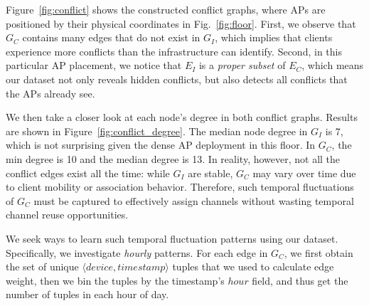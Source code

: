 Figure~\ref{fig:conflict} shows the constructed conflict graphs, where APs are positioned 
by their physical coordinates in Fig.~\ref{fig:floor}. First, we
observe that $G_C$ contains many edges that do not exist in $G_I$, which
implies that clients experience more conflicts than the infrastructure can
identify. Second, in this particular AP placement, we notice that $E_I$ is a
\textit{proper subset} of $E_C$, which means our dataset not only reveals hidden
conflicts, but also detects all conflicts that the APs already see.

We then take a closer look at each node's degree in both conflict graphs.
Results are shown in Figure~\ref{fig:conflict_degree}. The median node degree in
$G_I$ is 7, which is not surprising given the dense AP deployment in this floor.
In $G_C$, the min degree is 10 and the median degree is 13. In reality, however,
not all the conflict edges exist all the time: while $G_I$ are stable, $G_C$
may vary over time due to client mobility or association behavior. Therefore,
such temporal fluctuations of $G_C$ must be captured to effectively assign
channels without wasting temporal channel reuse opportunities.

We seek ways to learn such temporal fluctuation patterns using our dataset.
Specifically, we investigate \textit{hourly} patterns. For each edge in
$G_C$, we first obtain the set of unique $\langle device, timestamp \rangle$
tuples that we used to calculate edge weight, then we bin the tuples by the
timestamp's $hour$ field, and thus get the number of tuples in each hour of
day.


